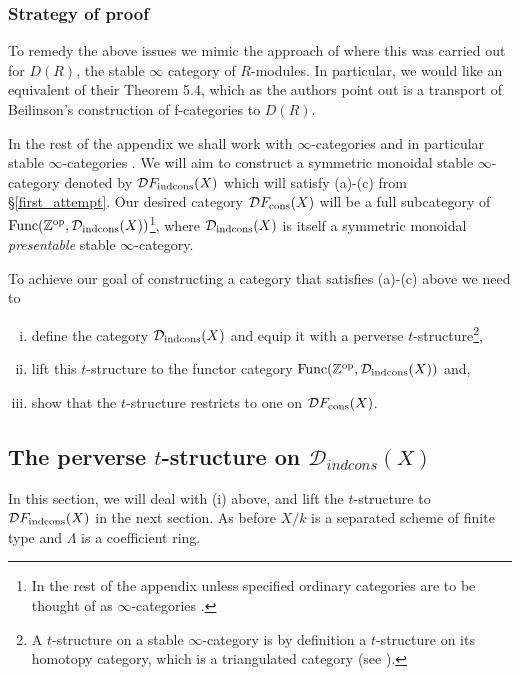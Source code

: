 \documentclass[12pt, reqno]{amsart}
\theoremstyle{plain}
\theoremstyle{definition}
\theoremstyle{definition}
\newcommand{\bbZ}{{\mathbb Z}}
\newcommand{\cD}{{\mathcal D}}
\begin{document}
\subsubsection{Strategy of proof}To remedy the above issues we mimic the approach of \cite[\S 5.1]{BMS19} where this was carried out for $D(R)$, the stable $\infty$ category of $R$-modules. In particular, we would like an equivalent of their Theorem 5.4, which as the authors point out is a transport of Beilinson's construction of f-categories to $D(R)$.



In the rest of the appendix we shall work with $\infty$-categories \cite[\S 1.1.2]{HTT} and in particular stable $\infty$-categories \cite[Definition 1.1.9]{HA}. We will aim to construct a symmetric monoidal stable $\infty$-category denoted by $\cD F_{\textup{indcons}}(X)$ which will satisfy (a)-(c) from \S \ref{first_attempt}. Our desired category $\cD F_{\textup{cons}}(X)$ will be a full subcategory of $\textup{Func}(\bbZ^{\textup{op}},\cD_{\textup{indcons}}(X))$\footnote{In the rest of the appendix unless specified ordinary categories are to be thought of as $\infty$-categories \cite[Proposition 1.1.2.2]{HTT}.}, where $\cD_{\textup{indcons}}(X)$ is itself a symmetric monoidal \textit{presentable} stable $\infty$-category.

To achieve our goal of constructing a category that satisfies (a)-(c) above we need to 
\begin{enumerate}[(i)]
    \item define the category $\cD_{\textup{indcons}}(X)$ and equip it with a perverse $t$-structure\footnote{A $t$-structure on a stable $\infty$-category is by definition a $t$-structure on its homotopy category, which is a triangulated category (see \cite[Definition 1.2.1.4]{HA} ).},
    \item lift this $t$-structure to the functor category $\textup{Func}(\bbZ^{\textup{op}},\cD_{\textup{indcons}}(X))$ and,
    \item show that the $t$-structure restricts to one on $\cD F_{\textup{cons}}(X)$.
\end{enumerate}


\subsection{The perverse $t$-structure on $\cD_{indcons}(X)$}
In this section, we will deal with (i) above, and lift the $t$-structure to $\cD F_{\textup{indcons}}(X)$ in the next section. As before $X/k$ is a separated scheme of finite type and $\Lambda$ is a coefficient ring. 
\end{document}

